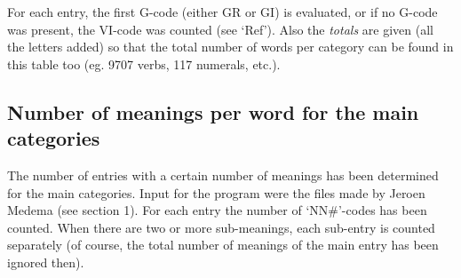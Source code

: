 For each entry, the first G-code (either GR or GI) is evaluated, or if no
G-code was present, the VI-code was counted (see `Ref').
Also the {\em totals} are given (all the letters added) 
so that the total number of words per category can be found in this table too 
(eg. 9707 verbs, 117 numerals, etc.).

\subsection{Number of meanings per word for the main categories}
The number of entries with a certain number of meanings has been determined
for the main categories.
Input for the program were the files made by Jeroen Medema (see section 1). 
For each entry the number of `NN\#'-codes has been counted. When there are two 
or more sub-meanings, each sub-entry is counted separately (of course, the total
number of meanings of the main entry has been ignored then).

